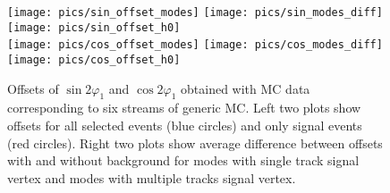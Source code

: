 \documentclass[preprint,aps,showpacs]{revtex4}
\newcommand{\sindbeta}{\ensuremath{\sin{2\varphi_1}}\xspace}
\newcommand{\cosdbeta}{\ensuremath{\cos{2\varphi_1}}\xspace}
\begin{document}
\begin{figure}[htb]
 \texttt{[image: pics/sin\_offset\_modes]}
 \texttt{[image: pics/sin\_modes\_diff]}
 \texttt{[image: pics/sin\_offset\_h0]}\\
 \texttt{[image: pics/cos\_offset\_modes]}
 \texttt{[image: pics/cos\_modes\_diff]}
 \texttt{[image: pics/cos\_offset\_h0]}
 \caption{Offsets of \sindbeta and \cosdbeta obtained with MC data corresponding to six streams of generic MC. Left two plots show offsets for all selected events (blue circles) and only signal events (red circles). Right two plots show average difference between offsets with and without background for modes with single track signal vertex and modes with multiple tracks signal vertex.}
 \label{fig:gen_mc_cpv_offsets}
\end{figure}

\end{document}
